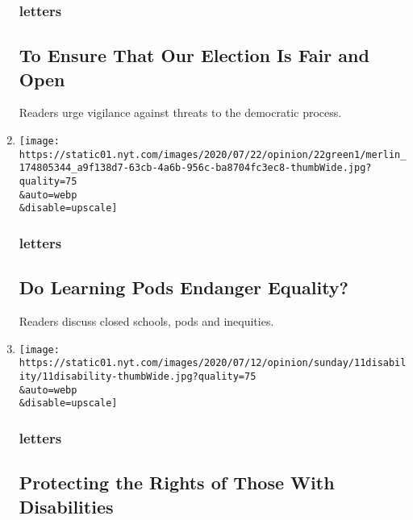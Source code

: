\begin{enumerate}
  \hypertarget{letters-2}{%
  \subsubsection{letters}\label{letters-2}}

  \hypertarget{to-ensure-that-our-election-is-fair-and-open}{%
  \subsection{To Ensure That Our Election Is Fair and
  Open}\label{to-ensure-that-our-election-is-fair-and-open}}

  Readers urge vigilance against threats to the democratic process.
\item
  \href{/2020/08/02/opinion/letters/virus-education.html}{}

  \texttt{[image: https://static01.nyt.com/images/2020/07/22/opinion/22green1/merlin\_174805344\_a9f138d7-63cb-4a6b-956c-ba8704fc3ec8-thumbWide.jpg?quality=75\\\&auto=webp\\\&disable=upscale]}

  \hypertarget{letters-3}{%
  \subsubsection{letters}\label{letters-3}}

  \hypertarget{do-learning-pods-endanger-equality}{%
  \subsection{Do Learning Pods Endanger
  Equality?}\label{do-learning-pods-endanger-equality}}

  Readers discuss closed schools, pods and inequities.
\item
  \href{/2020/08/01/opinion/letters/disability-law.html}{}

  \texttt{[image: https://static01.nyt.com/images/2020/07/12/opinion/sunday/11disability/11disability-thumbWide.jpg?quality=75\\\&auto=webp\\\&disable=upscale]}

  \hypertarget{letters-4}{%
  \subsubsection{letters}\label{letters-4}}

  \hypertarget{protecting-the-rights-of-those-with-disabilities}{%
  \subsection{Protecting the Rights of Those With
  Disabilities}\label{protecting-the-rights-of-those-with-disabilities}}


\end{enumerate}
